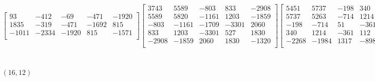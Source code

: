 \documentclass[12pt]{amsart}
\theoremstyle{plain}
\theoremstyle{definition}
\begin{document}
\begin{landscape}
\begin{align*}
\begin{bmatrix}
 93  &   -412  &   -69  &   -471  &   -1920  \\ 
 1835  &   -319  &   -471  &   -1692  &   815  \\ 
 -1011  &   -2334  &   -1920  &   815  &   -1571  \\ 
\end{bmatrix}
\begin{bmatrix}
3743  &   5589  &   -803  &   833  &   -2908  \\ 
 5589  &   5820  &   -1161  &   1203  &   -1859  \\ 
 -803  &   -1161  &   -1709  &   -3301  &   2060  \\ 
 833  &   1203  &   -3301  &   527  &   1830  \\ 
 -2908  &   -1859  &   2060  &   1830  &   -1320  \\ 
\end{bmatrix}
\begin{bmatrix}
5451  &   5737  &   -198  &   340  &   -2268  \\ 
 5737  &   5263  &   -714  &   1214  &   -1984  \\ 
 -198  &   -714  &   51  &   -361  &   1317  \\ 
 340  &   1214  &   -361  &   112  &   -898  \\ 
 -2268  &   -1984  &   1317  &   -898  &   -831  \\ 
\end{bmatrix}
\begin{bmatrix}
-5669  &   -5668  &   355  &   -893  &   2055  \\ 
 -5668  &   -6289  &   912  &   -1164  &   2404  \\ 
 355  &   912  &   -1253  &   1387  &   159  \\ 
 -893  &   -1164  &   1387  &   -1877  &   -417  \\ 
 2055  &   2404  &   159  &   -417  &   -1434  \\ 
\end{bmatrix}
\\
(16,12) &:
\begin{bmatrix}
1535  &   -1461  &   2919  &   947  &   -1403  \\ 
 -1461  &   -1441  &   -980  &   841  &   -366  \\ 
 2919  &   -980  &   107  &   -2221  &   630  \\ 
 947  &   841  &   -2221  &   3080  &   961  \\ 
 -1403  &   -366  &   630  &   961  &   1001  \\ 
\end{bmatrix}

\end{align*}
\end{landscape}
\end{document}
